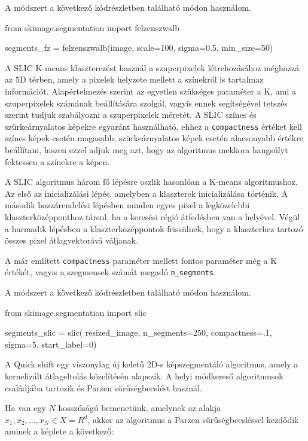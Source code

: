 A módszert a következő kódrészletben található módon használom.
\begin{python}
from skimage.segmentation import felzenszwalb

segments_fz = felzenszwalb(image, scale=100, sigma=0.5, min_size=50)
\end{python}


A SLIC K-means klaszterezést használ a szuperpixelek létrehozásához méghozzá az 5D térben, amely a pixelek helyzete mellett a színekről is tartalmaz információt. Alapértelmezés szerint az egyetlen szükséges paraméter a K, ami a szuperpixelek számának beállítására szolgál, vagyis ennek segítségével tetszés szerint tudjuk szabályozni a szuperpixelek méretét. A SLIC színes és szürkeárnyalatos képekre egyaránt használható, ehhez a \texttt{compactness} értéket kell színes képek esetén magasabb, szürkeárnyalatos képek esetén alacsonyabb értékre beállítani, hiszen ezzel adjuk meg azt, hogy az algoritmus mekkora hangsúlyt fektessen a színekre a képen.

A SLIC algoritmus három fő lépésre oszlik hasonlóan a K-means algoritmushoz. Az első az inicializálási lépés, amelyben a klaszterek inicializálása történik. A második hozzárendelési lépésben minden egyes pixel a legközelebbi klaszterközépponthoz társul, ha a keresési régió átfedésben van a helyével. Végül a harmadik lépésben a klaszterközéppontok frissülnek, hogy a klaszterhez tartozó összes pixel átlagvektorává váljanak.

 A már említett \texttt{compactness} paraméter mellett fontos paraméter még a K értékét, vagyis a szegmensek számát megadó \texttt{n\_segments}. \cite{superpixel} \cite{superpixel_example}

A módszert a következő kódrészletben található módon használom.
\begin{python}
from skimage.segmentation import slic

segments_slic = slic(
    resized_image,
    n_segments=250,
    compactness=.1,
    sigma=5,
    start_label=0)
\end{python}


A Quick shift egy viszonylag új keletű 2D-s képszegmentáló algoritmus, amely a kernelizált átlageltolás közelítésén alapszik. A helyi módkereső algoritmusok családjába tartozik és Parzen sűrűségbecslést használ.

Ha van egy $N$ hosszúságú bemenetünk, amelynek az alakja $x_1, x_2, \dots, x_N \in X = R^d$, akkor az algoritmus a Parzen sűrűségbecsléssel kezdődik aminek a képlete a következő:

